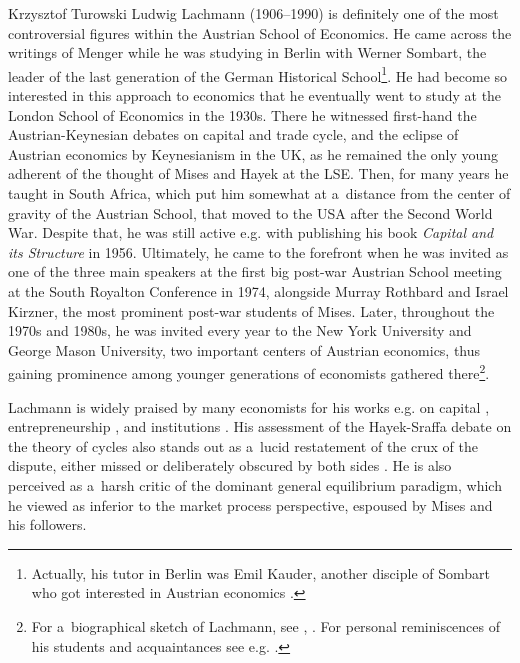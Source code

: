 \begin{artengenv}{Krzysztof Turowski}
\lettrine[loversize=0.13,lines=2,lraise=-0.03,nindent=0em,findent=0.2pt]%
{L}{}udwig Lachmann (1906--1990) is definitely one of the most controversial figures within the Austrian School of Economics.
He came across the writings of Menger while he was studying in Berlin with Werner Sombart, the leader of the last generation of the German Historical School\footnote{Actually, his tutor in Berlin was Emil Kauder, another disciple of Sombart who got interested in Austrian economics \parencite[111]{wasserman-kauder}.}.
He had become so interested in this approach to economics that he eventually went to study at the London School of Economics in the 1930s.
There he witnessed first-hand the Austrian-Keynesian debates on capital and trade cycle, and the eclipse of Austrian economics by Keynesianism in the UK, as he remained the only young adherent of the thought of Mises and Hayek at the LSE.
Then, for many years he taught in South Africa, which put him somewhat at a~distance from the center of gravity of the Austrian School, that moved to the USA after the Second World War. Despite that, he was still active e.g. with publishing his book \emph{Capital and its Structure} in 1956.
Ultimately, he came to the forefront when he was invited as one of the three main speakers at the first big post-war Austrian School meeting at the South Royalton Conference in 1974, alongside Murray Rothbard and Israel Kirzner, the most prominent post-war students of Mises.
Later, throughout the 1970s and 1980s, he was invited every year to the New York University and George Mason University, two important centers of Austrian economics, thus gaining prominence among younger generations of economists gathered there\footnote{For a~biographical sketch of Lachmann, see \textcite{mittenmaier}, \textcite{lewin-life}. For personal reminiscences of his students and acquaintances see e.g. \textcite{reminiscences,caldwell,boehm,boehm2000professor}.}.

Lachmann is widely praised by many economists for his works e.g. on capital \parencite{rothbard-present,lewin-life}, entrepreneurship \parencite{endres2013wresting,horwitz-entrepreneurship}, and institutions \parencite{foss2007institutions}. His assessment of the Hayek-Sraffa debate on the theory of cycles also stands out as a~lucid restatement of the crux of the dispute, either missed or deliberately obscured by both sides \parencite{gordon-other}.
He is also perceived as a~harsh critic of the dominant general equilibrium paradigm, which he viewed as inferior to the market process perspective, espoused by Mises and his followers.


\end{artengenv}

